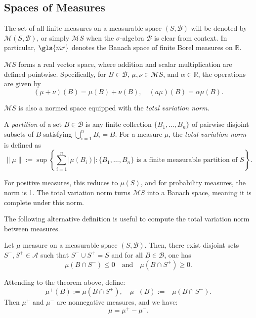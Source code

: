 \subsection{Spaces of Measures}

The set of all finite measures on a measurable space $(S, \mathcal{B})$ will be denoted by $\mathcal{M}(S, \mathcal{B})$, 
or simply $\mathcal{M}S$ when the $\sigma$-algebra $\mathcal{B}$ is clear from context. In particular, $\gls{mr}$ denotes  the Banach space of finite Borel measures on $\mathbb{R}$.

 $\mathcal{M}S $ forms a real vector space, where addition and scalar multiplication are defined pointwise. Specifically, for  $ B \in \mathcal{B} $, $ \mu, \nu \in \mathcal{M}S $, and $ \alpha \in \mathbb{R} $, the operations are given by
$$
(\mu + \nu)(B) = \mu(B) + \nu(B), \quad (a\mu)(B) = \alpha \mu(B).
$$


\( \mathcal{M}S \) is also a normed space equipped with the \emph{total variation norm}. 

\begin{definition} \label{def:tvnorm}
  A \emph{partition} of a set \( B \in \mathcal{B} \) is any finite collection \( \{B_1, \dots, B_n\} \) of pairwise disjoint subsets of \( B \) satisfying \( \bigcup_{i=1}^{n} B_i = B \). For a measure \( \mu \), the \emph{total variation norm} is defined as
$$
\|\mu\| := \sup \left\{ \sum_{i=1}^n |\mu(B_i)| : \{B_1, \dots, B_n\} \text{ is a finite measurable partition of } S \right\}.
$$
\end{definition}

For positive measures, this reduces to \( \mu(S) \), and for probability measures, the norm is 1. The total variation norm turns \( \mathcal{M}S \) into a Banach space, meaning it is complete under this norm. 

The following alternative definition is useful to compute the total variation norm between measures.

\begin{theorem} \cite[Theorem 3.1.1]{bogachevMeasureTheory2007}
  Let \( \mu \) measure on a measurable space \( (S, \mathcal{B}) \). Then, there exist disjoint sets \( S^-, S^+ \in \mathcal{A} \) such that $S^- \cup S^+ = S$
and for all \( B \in \mathcal{B} \), one has
\[
\mu(B \cap S^-) \leq 0 \quad \text{and} \quad \mu(B \cap S^+) \geq 0.
\]
\end{theorem}

\begin{corollary} \cite[Corollary 3.1.2]{bogachevMeasureTheory2007}
  Attending to the theorem above, define:
\[
\mu^+(B) := \mu(B \cap S^+), \quad \mu^-(B) := -\mu(B \cap S^-). 
\]
Then \( \mu^+ \) and \( \mu^- \) are nonnegative measures, and we have:
\[
\mu = \mu^+ - \mu^-.
\]
\end{corollary}

